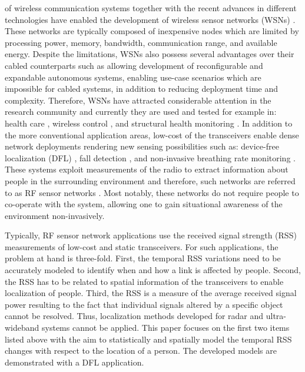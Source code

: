 \documentclass[journal, 10pt, twocolumn, balance]{IEEEtran}
\begin{document}
 of wireless communication systems together with the recent advances in different technologies have enabled the development of wireless sensor networks (WSNs) \cite{Akyildiz2002}. These networks are typically composed of inexpensive nodes which are limited by processing power, memory, bandwidth, communication range, and available energy. Despite the limitations, WSNs also possess several advantages over their cabled counterparts such as allowing development of reconfigurable and expandable autonomous systems, enabling use-case scenarios which are impossible for cabled systems, in addition to reducing deployment time and complexity. Therefore, WSNs have attracted considerable attention in the research community and currently they are used and tested for example in: health care \cite{Ko2010b}, wireless control \cite{kaltiokallio2011}, and structural health monitoring \cite{Bocca2011}. In addition to the more conventional application areas, low-cost of the transceivers enable dense network deployments rendering new sensing possibilities such as: device-free localization (DFL) \cite{patwari08}, fall detection \cite{mager2013}, and non-invasive breathing rate monitoring \cite{ Patwari2011}. These systems exploit measurements of the radio to extract information about people in the surrounding environment and therefore, such networks are referred to as RF sensor networks \cite{patwari2010}. Most notably, these networks do not require people to co-operate with the system, allowing one to gain situational awareness of the environment non-invasively. 
	
Typically, RF sensor network applications use the received signal strength (RSS) measurements of low-cost and static transceivers. For such applications, the problem at hand is three-fold. First, the temporal RSS variations need to be accurately modeled to identify when and how a link is affected by people. Second, the RSS has to be related to spatial information of the transceivers to enable localization of people. Third, the RSS is a measure of the average received signal power resulting to the fact that individual signals altered by a specific object cannot be resolved. Thus, localization methods developed for radar and ultra-wideband systems cannot be applied. This paper focuses on the first two items listed above with the aim to statistically and spatially model the temporal RSS changes with respect to the location of a person. The developed models are demonstrated with a DFL application.
\end{document}
